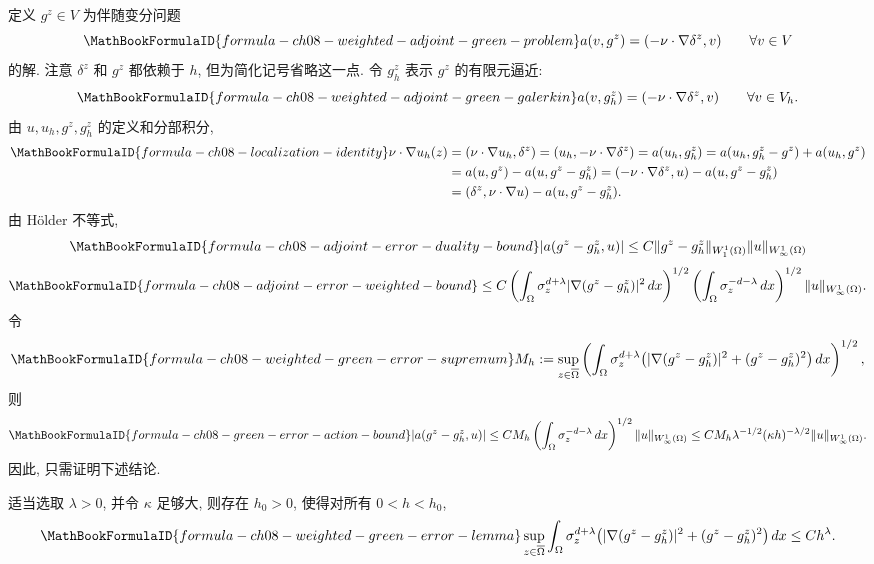 定义 $g^z\in V$ 为伴随变分问题
\[
\MathBookFormulaID{formula-ch08-weighted-adjoint-green-problem}
a(v,g^z)=(-\nu\cdot\nabla\delta^z,v)
\qquad\forall v\in V
\]
的解. 注意 $\delta^z$ 和 $g^z$ 都依赖于 $h$, 但为简化记号省略这一点. 令 $g_h^z$ 表示 $g^z$ 的有限元逼近:
\[
\MathBookFormulaID{formula-ch08-weighted-adjoint-green-galerkin}
a(v,g_h^z)=(-\nu\cdot\nabla\delta^z,v)
\qquad\forall v\in V_h.
\]
由 $u,u_h,g^z,g_h^z$ 的定义和分部积分,
\begin{align}
\MathBookFormulaID{formula-ch08-localization-identity}
\nu\cdot\nabla u_h(z)
&=(\nu\cdot\nabla u_h,\delta^z)=(u_h,-\nu\cdot\nabla\delta^z)
=a(u_h,g_h^z)=a(u_h,g_h^z-g^z)+a(u_h,g^z)\notag\\
&=a(u,g^z)-a(u,g^z-g_h^z)
=(-\nu\cdot\nabla\delta^z,u)-a(u,g^z-g_h^z)\notag\\
&=(\delta^z,\nu\cdot\nabla u)-a(u,g^z-g_h^z).
\label{eq:ch08-localization-identity}
\end{align}
由 Hölder 不等式,
\[
\MathBookFormulaID{formula-ch08-adjoint-error-duality-bound}
|a(g^z-g_h^z,u)|\leq C\|g^z-g_h^z\|_{W_1^1(\Omega)}\|u\|_{W_\infty^1(\Omega)}
\]
\[
\MathBookFormulaID{formula-ch08-adjoint-error-weighted-bound}
\leq C\left(\int_\Omega\sigma_z^{d+\lambda}|\nabla(g^z-g_h^z)|^2\,dx\right)^{1/2}
\left(\int_\Omega\sigma_z^{-d-\lambda}\,dx\right)^{1/2}\|u\|_{W_\infty^1(\Omega)}.
\]
令
\begin{equation}
\MathBookFormulaID{formula-ch08-weighted-green-error-supremum}
\label{eq:ch08-weighted-green-error-supremum}
M_h:=\sup_{z\in\overline\Omega}
\left(\int_\Omega\sigma_z^{d+\lambda}
\bigl(|\nabla(g^z-g_h^z)|^2+(g^z-g_h^z)^2\bigr)\,dx\right)^{1/2},
\end{equation}
则
\begin{equation}
\MathBookFormulaID{formula-ch08-green-error-action-bound}
\label{eq:ch08-green-error-action-bound}
|a(g^z-g_h^z,u)|\leq CM_h
\left(\int_\Omega\sigma_z^{-d-\lambda}\,dx\right)^{1/2}\|u\|_{W_\infty^1(\Omega)}
\leq CM_h\lambda^{-1/2}(\kappa h)^{-\lambda/2}\|u\|_{W_\infty^1(\Omega)}.
\end{equation}
因此, 只需证明下述结论.

\begin{Lemma}
\label{lem:ch08-weighted-green-error}
适当选取 $\lambda>0$, 并令 $\kappa$ 足够大, 则存在 $h_0>0$, 使得对所有 $0<h<h_0$,
\[
\MathBookFormulaID{formula-ch08-weighted-green-error-lemma}
\sup_{z\in\overline\Omega}\int_\Omega\sigma_z^{d+\lambda}
\bigl(|\nabla(g^z-g_h^z)|^2+(g^z-g_h^z)^2\bigr)\,dx\leq Ch^\lambda.
\]
\end{Lemma}

